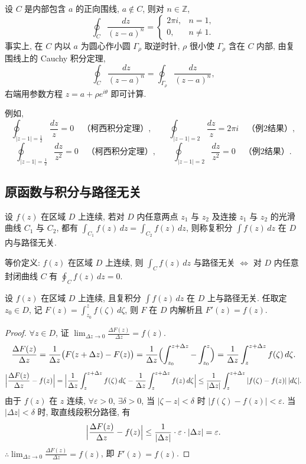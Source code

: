 \documentclass[theorem=false,mathfont=none,openany,sub3section]{easybook}
\begin{document}
\begin{example}
  设 $C$ 是内部包含 $a$ 的正向围线, $a\notin C$, 则对 $n\in\mathbb{Z}$,
  \[
  \oint_{C}\frac{dz}{(z-a)^{n}}=
  \begin{cases}
    2\pi i, & n=1,\\
    0, & n\neq1.
  \end{cases}
  \]
  事实上, 在 $C$ 内以 $a$ 为圆心作小圆 $\Gamma_{\rho}$ 取逆时针, $\rho$ 很小使 $\Gamma_{\rho}$ 含在 $C$ 内部, 由复围线上的 Cauchy 积分定理,
  \[
  \oint_{C}\frac{dz}{(z-a)^{n}}=
  \oint_{\Gamma_{\rho}}\frac{dz}{(z-a)^{n}},
  \]
  右端用参数方程 $z=a+\rho e^{i\theta}$ 即可计算.
\end{example}

例如,
\[
\oint_{|z-1|=\frac12}\frac{dz}{z}=0
\quad\text{（柯西积分定理）},\qquad
\oint_{|z-1|=2}\frac{dz}{z}=2\pi i
\quad\text{（例2结果）},
\]
\[
\oint_{|z-1|=\frac12}\frac{dz}{z^{2}}=0
\quad\text{（柯西积分定理）},\qquad
\oint_{|z-1|=2}\frac{dz}{z^{2}}=0
\quad\text{（例2结果）}.
\]

\subsection{原函数与积分与路径无关}

\begin{definition}
  设 $f(z)$ 在区域 $D$ 上连续, 若对 $D$ 内任意两点 $z_{1}$ 与 $z_{2}$ 及连接 $z_{1}$ 与 $z_{2}$ 的光滑曲线 $C_{1}$ 与 $C_{2}$, 都有 $\int_{C_{1}}f(z)\,dz=\int_{C_{2}}f(z)\,dz$, 则称复积分 $\int f(z)\,dz$ 在 $D$ 内与路径无关.\par
  等价定义: $f(z)$ 在区域 $D$ 上连续, 则 $\int_{C}f(z)\,dz$ 与路径无关 $\Leftrightarrow$ 对 $D$ 内任意封闭曲线 $C$ 有 $\oint_{C}f(z)\,dz=0$.
\end{definition}

\begin{theorem}
  设 $f(z)$ 在区域 $D$ 上连续, 且复积分 $\int f(z)\,dz$ 在 $D$ 上与路径无关. 任取定 $z_{0}\in D$, 记 $F(z)=\int_{z_{0}}^{z}f(\zeta)\,d\zeta$, 则 $F$ 在 $D$ 内解析且 $F'(z)=f(z)$.
\end{theorem}

\begin{proof}
  $\forall z\in D$, 证 $\lim_{\Delta z\to0}\frac{\Delta F(z)}{\Delta z}=f(z)$.
  \[
  \frac{\Delta F(z)}{\Delta z}
  =\frac{1}{\Delta z}\bigl(F(z+\Delta z)-F(z)\bigr)
  =\frac{1}{\Delta z}\Bigl(\int_{z_{0}}^{z+\Delta z}-\int_{z_{0}}^{z}\Bigr)
  =\frac{1}{\Delta z}\int_{z}^{z+\Delta z}f(\zeta)\,d\zeta.
  \]
  \[
  \Bigl|\frac{\Delta F(z)}{\Delta z}-f(z)\Bigr|
  =\Bigl|\frac{1}{\Delta z}\int_{z}^{z+\Delta z}f(\zeta)\,d\zeta
    -\frac{1}{\Delta z}\int_{z}^{z+\Delta z}f(z)\,d\zeta\Bigr|
  \leq\frac{1}{|\Delta z|}\int_{z}^{z+\Delta z}|f(\zeta)-f(z)|\,|d\zeta|.
  \]
  由于 $f(z)$ 在 $z$ 连续, $\forall\varepsilon>0$, $\exists\delta>0$, 当 $|\zeta-z|<\delta$ 时 $|f(\zeta)-f(z)|<\varepsilon$.
  当 $|\Delta z|<\delta$ 时, 取直线段积分路径, 有
  \[
  \Bigl|\frac{\Delta F(z)}{\Delta z}-f(z)\Bigr|
  \leq\frac{1}{|\Delta z|}\cdot\varepsilon\cdot|\Delta z|=\varepsilon.
  \]
  $\therefore\lim_{\Delta z\to0}\frac{\Delta F(z)}{\Delta z}=f(z)$, 即 $F'(z)=f(z)$.
\end{proof}
\end{document}
